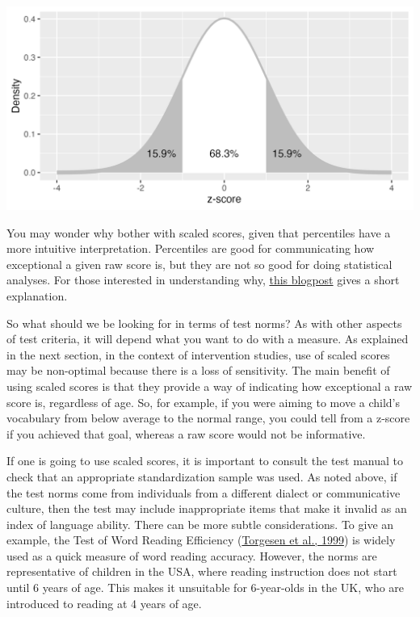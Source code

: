 \documentclass{krantz}
\begin{document}
\begin{tcolorbox}[enhanced, breakable,colback=Black!5!lightgray,colframe=black!75!black,coltitle=white,title=How scaled scores are derived]
\includegraphics[width=0.75\linewidth]{images_bw/zDensityCDF} \label{zDensityCDF}

You may wonder why bother with scaled scores, given that percentiles have a more intuitive interpretation. Percentiles are good for communicating how exceptional a given raw score is, but they are not so good for doing statistical analyses. For those interested in understanding why, \href{http://deevybee.blogspot.com/2011/04/short-nerdy-post-about-use-of.html}{this blogpost} gives a short explanation.
\end{tcolorbox}

So what should we be looking for in terms of test norms? As with other aspects of test criteria, it will depend what you want to do with a measure. As explained in the next section, in the context of intervention studies, use of scaled scores may be non-optimal because there is a loss of sensitivity. The main benefit of using scaled scores is that they provide a way of indicating how exceptional a raw score is, regardless of age. So, for example, if you were aiming to move a child's vocabulary from below average to the normal range, you could tell from a z-score if you achieved that goal, whereas a raw score would not be informative.

If one is going to use scaled scores, it is important to consult the test manual to check that an appropriate standardization sample was used. As noted above, if the test norms come from individuals from a different dialect or communicative culture, then the test may include inappropriate items that make it invalid as an index of language ability. There can be more subtle considerations. To give an example, the Test of Word Reading Efficiency (\protect\hyperlink{ref-torgesen1999}{Torgesen et al., 1999}) is widely used as a quick measure of word reading accuracy. However, the norms are representative of children in the USA, where reading instruction does not start until 6 years of age. This makes it unsuitable for 6-year-olds in the UK, who are introduced to reading at 4 years of age.
\end{document}
